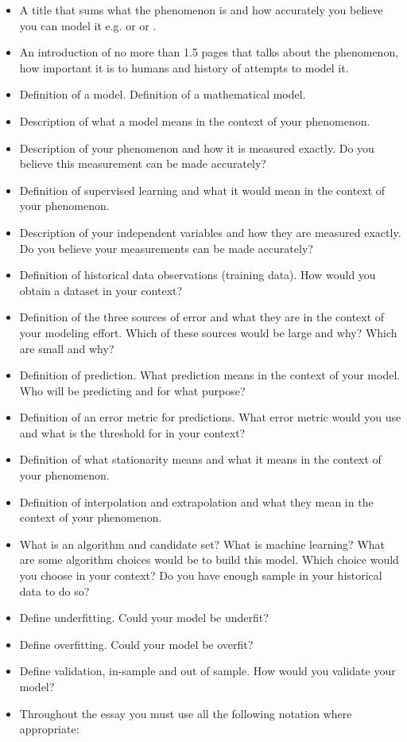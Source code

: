 \documentclass[12pt]{article}
\begin{document}
\begin{itemize}
\item A title that sums what the phenomenon is and how accurately you believe you can model it e.g.  or  or .
\item An introduction of no more than 1.5 pages that talks about the phenomenon, how important it is to humans and history of attempts to model it.
\item Definition of a model. Definition of a mathematical model.
\item Description of what a model means in the context of your phenomenon.
\item Description of your phenomenon and how it is measured exactly. Do you believe this measurement can be made accurately?
\item Definition of supervised learning and what it would mean in the context of your phenomenon.
\item Description of your independent variables and how they are measured exactly. Do you believe your measurements can be made accurately?
\item Definition of historical data observations (training data). How would you obtain a dataset in your context?
\item Definition of the three sources of error and what they are in the context of your modeling effort. Which of these sources would be large and why? Which are small and why?
\item Definition of prediction. What prediction means in the context of your model. Who will be predicting and for what purpose?
\item Definition of an error metric for predictions. What error metric would you use and what is the threshold for  in your context?
\item Definition of what stationarity means and what it means in the context of your phenomenon.
\item Definition of interpolation and extrapolation and what they mean in the context of your phenomenon.
\item What is an algorithm and candidate set? What is machine learning? What are some algorithm choices would be to build this model. Which choice would you choose in your context? Do you have enough sample in your historical data to do so?
\item Define underfitting. Could your model be underfit? 
\item Define overfitting. Could your model be overfit? 
\item Define validation, in-sample and out of sample. How would you validate your model?
\item Throughout the essay you must use all the following notation where appropriate:


\end{itemize}
\end{document}
